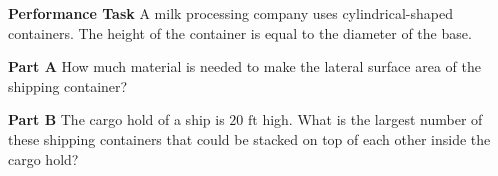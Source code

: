 \documentclass{article}
\newenvironment{practice}[2]{}{}
\newcommand{\placeholder}[2]{}
\begin{document}
\begin{practice}{50}{}
\textbf{Performance Task} A milk processing company uses cylindrical-shaped containers. The height of the container is equal to the diameter of the base.

\placeholder{illustration}{A cylindrical milk container inside a processing facility. Label 'volume $169.65 \text{ ft}^3$'.}

\textbf{Part A} How much material is needed to make the lateral surface area of the shipping container?

\textbf{Part B} The cargo hold of a ship is $20 \text{ ft}$ high. What is the largest number of these shipping containers that could be stacked on top of each other inside the cargo hold?
\end{practice}
\end{document}
